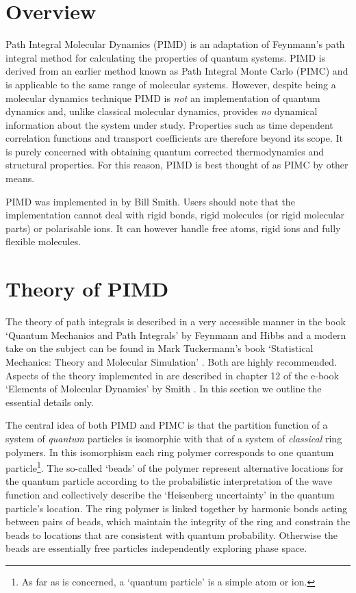 \section{Overview}

Path Integral Molecular Dynamics (PIMD) is an adaptation of Feynmann's
path integral method \cite{feynmann-65} for calculating the properties
of quantum systems. PIMD is derived from an earlier method known as
Path Integral Monte Carlo (PIMC) and is applicable to the same range
of molecular systems. However, despite being a molecular dynamics
technique PIMD is {\em not} an implementation of quantum dynamics and,
unlike classical molecular dynamics, provides {\em no} dynamical
information about the system under study. Properties such as time
dependent correlation functions and transport coefficients are
therefore beyond its scope.  It is purely concerned with obtaining
quantum corrected thermodynamics and structural properties. For this
reason, PIMD is best thought of as PIMC by other means.

PIMD was implemented in \D{} by Bill Smith. Users should note that the
implementation cannot deal with rigid bonds, rigid molecules (or rigid
molecular parts) or polarisable ions. It can however handle free atoms,
rigid ions and fully flexible molecules.

\section{Theory of PIMD}
\label{pimdtheory}

The theory of path integrals is described in a very accessible manner
in the book `Quantum Mechanics and Path Integrals' by Feynmann and
Hibbs \cite{feynmann-65} and a modern take on the subject can be found
in Mark Tuckermann's book `Statistical Mechanics: Theory and Molecular
Simulation' \cite{tuckerman-10}. Both are highly recommended. Aspects
of the theory implemented in \DD{} are described in chapter 12 of the
e-book `Elements of Molecular Dynamics' by Smith \cite{smith-14}. In
this section we outline the essential details only.

The central idea of both PIMD and PIMC is that the partition function
of a system of {\em quantum} particles is isomorphic with that of a
system of {\em classical} ring polymers. In this isomorphism each ring
polymer corresponds to one quantum particle\footnote{As far as \DD{}
  is concerned, a `quantum particle' is a simple atom or
  ion.}. The so-called `beads' of the polymer represent alternative
locations for the quantum particle according to the probabilistic
interpretation of the wave function and collectively describe the
`Heisenberg uncertainty' in the quantum particle's location. The ring
polymer is linked together by harmonic bonds acting between pairs of
beads, which maintain the integrity of the ring and constrain the
beads to locations that are consistent with quantum
probability. Otherwise the beads are essentially free particles
independently exploring phase space.

